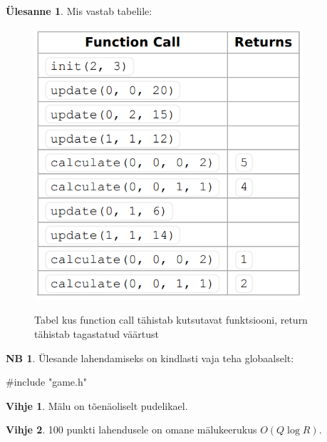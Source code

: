 \documentclass{trkut}
\theoremstyle{definition}
\newtheorem*{extra}{NB}
\newtheorem*{vihje}{Vihje}
\newtheorem*{Text}{Ülesanne}
\begin{document}
\begin{Text}
Mis vastab tabelile:

\begin{figure}[H]%
    \includegraphics[width=10cm]{ioitabel.png}%
    \caption{Tabel kus function call tähistab kutsutavat funktsiooni, return tähistab tagastatud väärtust}%
    \label{CPH}%
\end{figure}

\begin{extra}
Ülesande lahendamiseks on kindlasti vaja teha globaalselt:
\begin{cclol}
#include "game.h"
\end{cclol}
\end{extra}

\parencite{IOI}
\end{Text}

\begin{vihje}
Mälu on tõenäoliselt pudelikael.
\end{vihje}

\begin{vihje}
100 punkti lahendusele on omane mälukeerukus $O(Q\log R)$.
\end{vihje}
\end{document}
